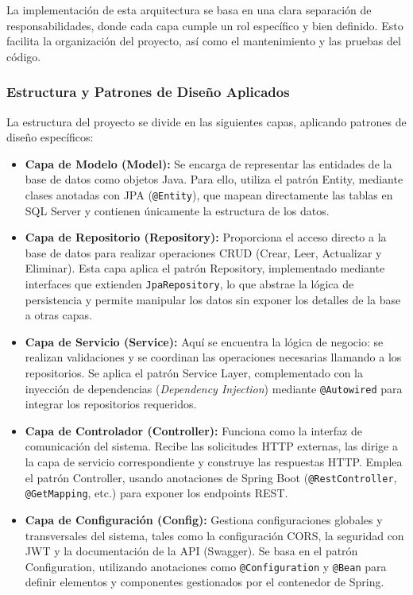 \documentclass[12pt]{article} %
\begin{document}
La implementación de esta arquitectura se basa en una clara separación de responsabilidades, donde cada capa cumple un rol específico y bien definido. Esto facilita la organización del proyecto, así como el mantenimiento y las pruebas del código.

\subsubsection*{Estructura y Patrones de Diseño Aplicados}

La estructura del proyecto se divide en las siguientes capas, aplicando patrones de diseño específicos:

\begin{itemize}
  \item \textbf{Capa de Modelo (Model):}  
  Se encarga de representar las entidades de la base de datos como objetos Java. Para ello, utiliza el patrón Entity, mediante clases anotadas con JPA (\texttt{@Entity}), que mapean directamente las tablas en SQL Server y contienen únicamente la estructura de los datos.

  \item \textbf{Capa de Repositorio (Repository):}  
  Proporciona el acceso directo a la base de datos para realizar operaciones CRUD (Crear, Leer, Actualizar y Eliminar). Esta capa aplica el patrón Repository, implementado mediante interfaces que extienden \texttt{JpaRepository}, lo que abstrae la lógica de persistencia y permite manipular los datos sin exponer los detalles de la base a otras capas.

  \item \textbf{Capa de Servicio (Service):}  
  Aquí se encuentra la lógica de negocio: se realizan validaciones y se coordinan las operaciones necesarias llamando a los repositorios. Se aplica el patrón Service Layer, complementado con la inyección de dependencias (\textit{Dependency Injection}) mediante \texttt{@Autowired} para integrar los repositorios requeridos.

  \item \textbf{Capa de Controlador (Controller):}  
  Funciona como la interfaz de comunicación del sistema. Recibe las solicitudes HTTP externas, las dirige a la capa de servicio correspondiente y construye las respuestas HTTP. Emplea el patrón Controller, usando anotaciones de Spring Boot (\texttt{@RestController}, \texttt{@GetMapping}, etc.) para exponer los endpoints REST.

  \item \textbf{Capa de Configuración (Config):}  
  Gestiona configuraciones globales y transversales del sistema, tales como la configuración CORS, la seguridad con JWT y la documentación de la API (Swagger). Se basa en el patrón Configuration, utilizando anotaciones como \texttt{@Configuration} y \texttt{@Bean} para definir elementos y componentes gestionados por el contenedor de Spring.
\end{itemize}
\end{document}
